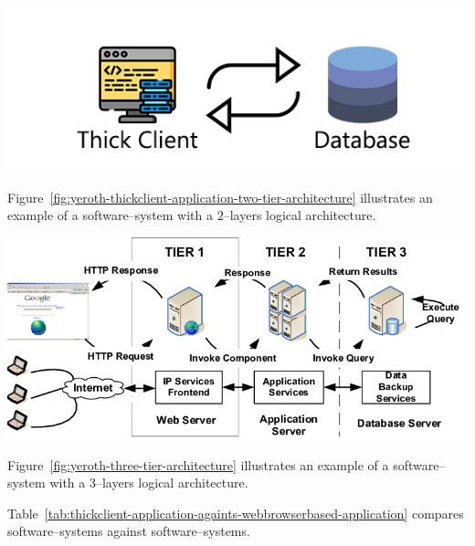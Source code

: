 \begin{center}
\includegraphics[scale=0.52]{images/yeroth-thickclient-application-two-tier-architecture.png}
\label{fig:yeroth-thickclient-application-two-tier-architecture}
\end{center}

Figure~\ref{fig:yeroth-thickclient-application-two-tier-architecture}
illustrates an example of a \thickclient
software--system with a $2$--layers
logical architecture.

\begin{center}
\includegraphics[scale=0.39]{images/yeroth-three-tier-architecture.png}
\label{fig:yeroth-three-tier-architecture}
\end{center}

Figure~\ref{fig:yeroth-three-tier-architecture}
illustrates an example of a \webbrowserbased
software--system with a $3$--layers
logical architecture.

Table~\ref{tab:thickclient-application-againts-webbrowserbased-application}
compares \thickclient software--systems against
\webbrowserbased software--systems.
